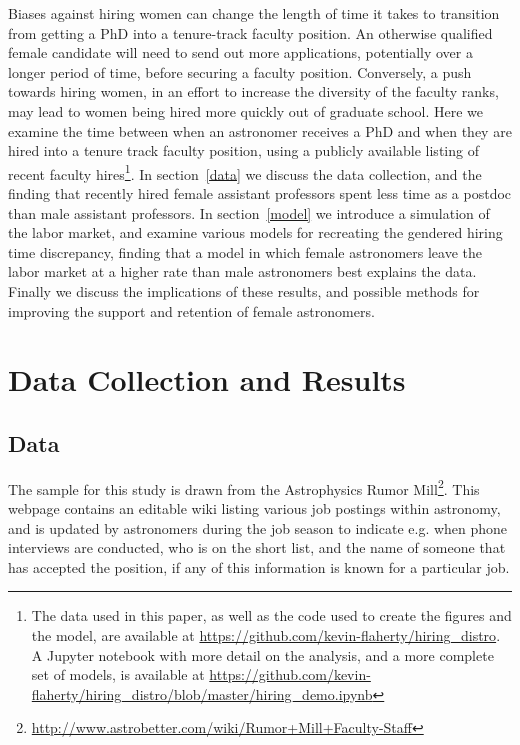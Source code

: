 \documentclass[modern]{aastex62}
\begin{document}
Biases against hiring women can change the length of time it takes to transition from getting a PhD into a tenure-track faculty position. An otherwise qualified female candidate will need to send out more applications, potentially over a longer period of time, before securing a faculty position. Conversely, a push towards hiring women, in an effort to increase the diversity of the faculty ranks, may lead to women being hired more quickly out of graduate school. Here we examine the time between when an astronomer receives a PhD and when they are hired into a tenure track faculty position, using a publicly available listing of recent faculty hires\footnote{The data used in this paper, as well as the code used to create the figures and the model, are available at \url{https://github.com/kevin-flaherty/hiring_distro}. A Jupyter notebook with more detail on the analysis, and a more complete set of models, is available at \url{https://github.com/kevin-flaherty/hiring_distro/blob/master/hiring_demo.ipynb}}. In section~\ref{data} we discuss the data collection, and the finding that recently hired female assistant professors spent less time as a postdoc than male assistant professors. In section~\ref{model} we introduce a simulation of the labor market, and examine various models for recreating the gendered hiring time discrepancy, finding that a model in which female astronomers leave the labor market at a higher rate than male astronomers best explains the data. Finally we discuss the implications of these results, and possible methods for improving the support and retention of female astronomers. 

\section{Data Collection and Results\label{data}}

\subsection{Data}
The sample for this study is drawn from the Astrophysics Rumor Mill\footnote{\url{http://www.astrobetter.com/wiki/Rumor+Mill+Faculty-Staff}}. This webpage contains an editable wiki listing various job postings within astronomy, and is updated by astronomers during the job season to indicate e.g. when phone interviews are conducted, who is on the short list, and the name of someone that has accepted the position, if any of this information is known for a particular job. 
\end{document}
